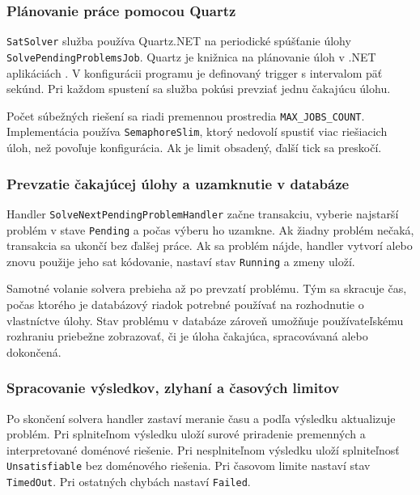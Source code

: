 \subsubsection{Plánovanie práce pomocou Quartz}\label{sec:implementation:quartz-scheduling}
\texttt{SatSolver} služba používa Quartz.NET na periodické spúšťanie úlohy \newline \texttt{SolvePendingProblemsJob}. Quartz je knižnica na plánovanie úloh v .NET aplikáciách \cite{quartz-documentation}. V konfigurácii programu je definovaný trigger s intervalom päť sekúnd. Pri každom spustení sa služba pokúsi prevziať jednu čakajúcu úlohu.

Počet súbežných riešení sa riadi premennou prostredia \texttt{MAX\_JOBS\_COUNT}. Implementácia používa \texttt{SemaphoreSlim}, ktorý nedovolí spustiť viac riešiacich úloh, než povoľuje konfigurácia. Ak je limit obsadený, ďalší tick sa preskočí.

\subsubsection{Prevzatie čakajúcej úlohy a uzamknutie v databáze}\label{sec:implementation:pending-task-locking}
Handler \texttt{SolveNextPendingProblemHandler} začne transakciu, vyberie najstarší problém v stave \texttt{Pending} a počas výberu ho uzamkne. Ak žiadny problém nečaká, transakcia sa ukončí bez ďalšej práce. Ak sa problém nájde, handler vytvorí alebo znovu použije jeho \acrshort{sat} kódovanie, nastaví stav \texttt{Running} a zmeny uloží.

Samotné volanie solvera prebieha až po prevzatí problému. Tým sa skracuje čas, počas ktorého je databázový riadok potrebné používať na rozhodnutie o vlastníctve úlohy. Stav problému v databáze zároveň umožňuje používateľskému rozhraniu priebežne zobrazovať, či je úloha čakajúca, spracovávaná alebo dokončená.

\subsubsection{Spracovanie výsledkov, zlyhaní a časových limitov}\label{sec:implementation:result-failure-timeout-processing}
Po skončení solvera handler zastaví meranie času a podľa výsledku aktualizuje problém. Pri splniteľnom výsledku uloží surové priradenie premenných a interpretované doménové riešenie. Pri nesplniteľnom výsledku uloží splniteľnosť \texttt{Unsatisfiable} bez doménového riešenia. Pri časovom limite nastaví stav \texttt{TimedOut}. Pri ostatných chybách nastaví \texttt{Failed}.

